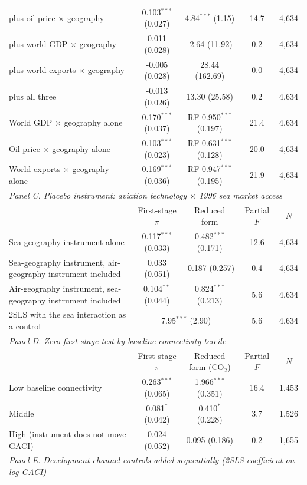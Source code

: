 \documentclass[12pt]{extarticle}
\begin{document}
\begin{table}[H]
{\begin{threeparttable}
\begin{tabular}{lcccc}
  \quad plus oil price $\times$ geography & 0.103$^{***}$ (0.027) & 4.84$^{***}$ (1.15) & 14.7 & 4,634 \\
  \quad plus world GDP $\times$ geography & 0.011 (0.028) & -2.64 (11.92) & 0.2 & 4,634 \\
  \quad plus world exports $\times$ geography & -0.005 (0.028) & 28.44 (162.69) & 0.0 & 4,634 \\
  \quad plus all three & -0.013 (0.026) & 13.30 (25.58) & 0.2 & 4,634 \\
  World GDP $\times$ geography alone & 0.170$^{***}$ (0.037) & RF 0.950$^{***}$ (0.197) & 21.4 & 4,634 \\
  Oil price $\times$ geography alone & 0.103$^{***}$ (0.023) & RF 0.631$^{***}$ (0.128) & 20.0 & 4,634 \\
  World exports $\times$ geography alone & 0.169$^{***}$ (0.036) & RF 0.947$^{***}$ (0.195) & 21.9 & 4,634 \\
\midrule
\multicolumn{5}{l}{\textit{Panel C. Placebo instrument: aviation technology $\times$ 1996 sea market access}} \\
 & First-stage $\pi$ & Reduced form & Partial $F$ & $N$ \\
  Sea-geography instrument alone & 0.117$^{***}$ (0.033) & 0.482$^{***}$ (0.171) & 12.6 & 4,634 \\
  Sea-geography instrument, air-geography instrument included & 0.033 (0.051) & -0.187 (0.257) & 0.4 & 4,634 \\
  Air-geography instrument, sea-geography instrument included & 0.104$^{**}$ (0.044) & 0.824$^{***}$ (0.213) & 5.6 & 4,634 \\
  \quad 2SLS with the sea interaction as a control & \multicolumn{2}{c}{7.95$^{***}$ (2.90)} & 5.6 & 4,634 \\
\midrule
\multicolumn{5}{l}{\textit{Panel D. Zero-first-stage test by baseline connectivity tercile}} \\
 & First-stage $\pi$ & Reduced form (CO$_2$) & Partial $F$ & $N$ \\
  Low baseline connectivity & 0.263$^{***}$ (0.065) & 1.966$^{***}$ (0.351) & 16.4 & 1,453 \\
  Middle & 0.081$^{*}$ (0.042) & 0.410$^{*}$ (0.228) & 3.7 & 1,526 \\
  High (instrument does not move GACI) & 0.024 (0.052) & 0.095 (0.186) & 0.2 & 1,655 \\
\midrule
\multicolumn{5}{l}{\textit{Panel E. Development-channel controls added sequentially (2SLS coefficient on log GACI)}} \\

\end{tabular}
\end{threeparttable}}
\end{table}
\end{document}
